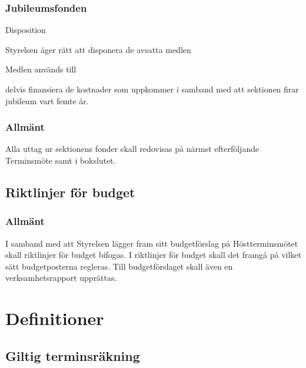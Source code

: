\documentclass[10pt]{article}
\renewcommand{\thesubsection}{\arabic{section}:\Alph{subsection}}
\begin{document}
\subsubsection{Jubileumsfonden}
\begin{emptylist}
\item Disposition
    \begin{dashlist}
    \item Styrelsen äger rätt att disponera de avsatta medlen
    \end{dashlist}
\end{emptylist}
\begin{emptylist}
\item Medlen används till
    \begin{dashlist}
    \item delvis finansiera de kostnader som uppkommer i samband med att sektionen firar jubileum vart femte år.
    \end{dashlist}
\end{emptylist}

\subsubsection{Allmänt}

Alla uttag ur sektionens fonder skall redovisas på närmst efterföljande
Terminsmöte samt i bokslutet.

\subsection{Riktlinjer för budget}

\subsubsection{Allmänt}

I samband med att Styrelsen lägger fram sitt budgetförslag på Höstterminsmötet skall riktlinjer för budget bifogas. I riktlinjer för budget skall det framgå
på vilket sätt budgetposterna regleras. Till budgetförslaget skall även en verksamhetsrapport upprättas.

\renewcommand*\thesubsection{\arabic{section}:\Alph{subsection}}
\section{Definitioner}

\subsection{Giltig terminsräkning}
\end{document}
